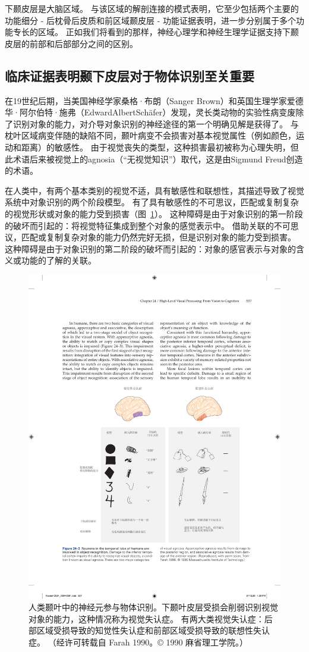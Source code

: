 下颞皮层是大脑区域。
与该区域的解剖连接的模式表明，它至少包括两个主要的功能细分 - 后枕骨后皮质和前区域颞皮层 - 功能证据表明，进一步分别属于多个功能专长的区域。
正如我们将看到的那样，神经心理学和神经生理学证据支持下颞皮层的前部和后部部分之间的区别。



\subsection{临床证据表明颞下皮层对于物体识别至关重要}

在19世纪后期，当美国神经学家桑格·布朗（Sanger Brown）和英国生理学家爱德华·阿尔伯特·施弗（EdwardAlbertSchäfer）发现，灵长类动物的实验性病变废除了识别对象的能力，对介导对象识别的神经途径的第一个明确见解是获得了。
与枕叶区域病变伴随的缺陷不同，颞叶病变不会损害对基本视觉属性（例如颜色，运动和距离）的敏感性。
由于视觉丧失的类型，这种损害最初被称为心理失明，但此术语后来被视觉上的agnosia（“无视觉知识”）取代，这是由Sigmund Freud创造的术语。


在人类中，有两个基本类别的视觉不适，具有敏感性和联想性，其描述导致了视觉系统中对象识别的两个阶段模型。
有了具有敏感性的不可思议，匹配或复制复杂的视觉形状或对象的能力受到损害（图~\ref{fig:24_3}）。
这种障碍是由于对象识别的第一阶段的破坏而引起的：将视觉特征集成到整个对象的感觉表示中。
借助关联的不可思议，匹配或复制复杂对象的能力仍然完好无损，但是识别对象的能力受到损害。
这种障碍是由于对象识别的第二阶段的破坏而引起的：对象的感官表示与对象的含义或功能的了解的关联。


\begin{figure}[htbp]
	\centering
	\includegraphics[width=0.8\linewidth]{chap24/fig_24_3}
	\caption{人类颞叶中的神经元参与物体识别。下颞叶皮层受损会削弱识别视觉对象的能力，这种情况称为视觉失认症。 有两大类视觉失认症：后部区域受损导致的知觉性失认症和前部区域受损导致的联想性失认症。 （经许可转载自 Farah 1990。© 1990 麻省理工学院。）}
	\label{fig:24_3}
\end{figure}


